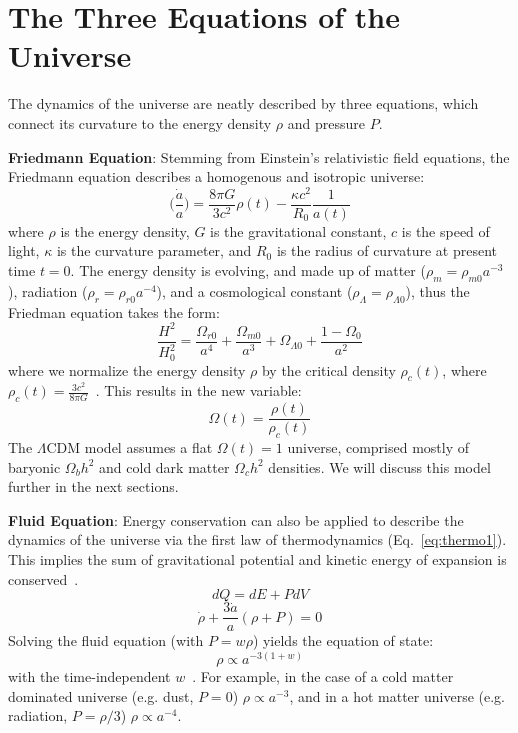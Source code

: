 \section{The Three Equations of the Universe}

The dynamics of the universe are neatly described by three equations, which connect its curvature to the energy density $\rho$ and pressure $P$.

\noindent
\textbf{Friedmann Equation}:  Stemming from Einstein's relativistic field equations, the Friedmann equation describes a homogenous and isotropic universe:  
\begin{equation}
    \bigg ( \frac{\Dot{a}}{a} \bigg ) = \frac{8\pi G}{3c^2}\rho(t) - \frac{\kappa c^2}{R_0}\frac{1}{a(t)}
\end{equation}
where $\rho$ is the energy density, $G$ is the gravitational constant, $c$ is the speed of light, $\kappa$ is the curvature parameter, and $R_0$ is the radius of curvature at present time $t=0$.  The energy density is evolving, and made up of matter ($\rho_m=\rho_{m0}a^{-3}$), radiation ($\rho_r=\rho_{r0}a^{-4}$), and a cosmological constant ($\rho_{\Lambda}=\rho_{\Lambda 0}$), thus the Friedman equation takes the form:
\begin{equation}
    \frac{H^2}{H_0^2} = \frac{\Omega_{r0}}{a^4} + \frac{\Omega_{m0}}{a^3} + \Omega_{\Lambda 0} + \frac{1-\Omega_0}{a^2}
\end{equation}
where we normalize the energy density $\rho$ by the critical density $\rho_c(t)$, where $\rho_c(t) = \frac{3c^2}{8\pi G}$~\cite{ryden_2016}.  This results in the new variable:
\begin{equation}
    \Omega(t) = \frac{\rho(t)}{\rho_c(t)}
\end{equation}
The $\Lambda$CDM model assumes a flat $\Omega(t)=1$ universe, comprised mostly of baryonic $\Omega_b h^2$ and cold dark matter $\Omega_c h^2$ densities.  We will discuss this model further in the next sections.

\noindent
\textbf{Fluid Equation}:  Energy conservation can also be applied to describe the dynamics of the universe via the first law of thermodynamics (Eq.~\ref{eq:thermo1}).  This implies the sum of gravitational potential and kinetic energy of expansion is conserved~\cite{ryden_2016}.
\begin{equation}
    dQ = dE + PdV
    \label{eq:thermo1}
\end{equation}
\begin{equation}
    \dot{\rho} + \frac{3\dot{a}}{a}(\rho + P) = 0
    \label{eq:fluid_universe}
\end{equation}
\noindent
Solving the fluid equation (with $P=w\rho$) yields the equation of state:
\begin{equation}
    \rho \propto a^{-3(1+w)}
\end{equation}
with the time-independent $w$~\cite{weinberg_cosmo}.  For example, in the case of a cold matter dominated universe (e.g. dust, $P = 0$) $\rho\propto a^{-3}$, and in a hot matter universe (e.g. radiation, $P=\rho/3$) $\rho\propto a^{-4}$.


